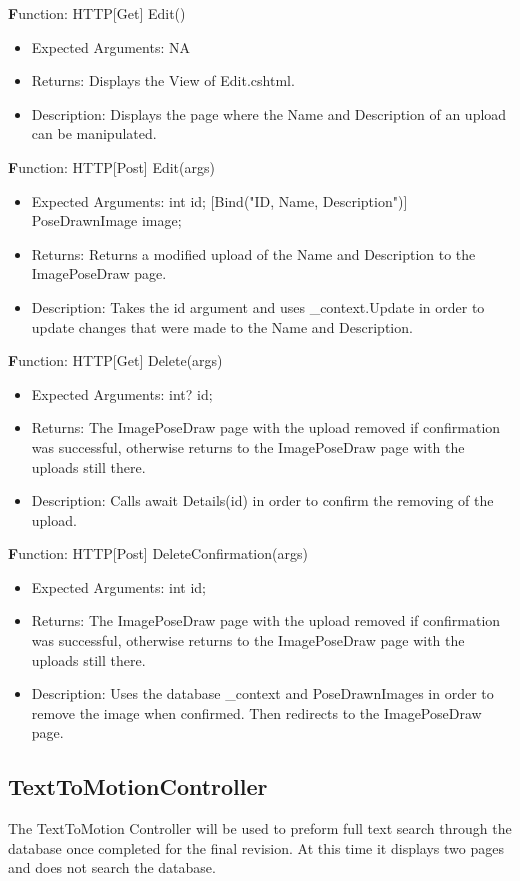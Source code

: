 \documentclass{scrreprt}
\begin{document}
  \textbf Function: HTTP[Get] Edit()
  \begin{itemize}
    \item Expected Arguments:
    NA
    \item Returns:
    Displays the View of Edit.cshtml.
    \item Description:
    Displays the page where the Name and Description of an upload can be manipulated.
  \end{itemize}

  \textbf Function: HTTP[Post] Edit(args)
  \begin{itemize}
    \item Expected Arguments:
    int id;
    [Bind("ID, Name, Description")] PoseDrawnImage image;
    \item Returns:
    Returns a modified upload of the Name and Description to the ImagePoseDraw page.
    \item Description:
    Takes the id argument and uses \_context.Update in order to update changes that were made to the Name and Description.
  \end{itemize}

  \textbf Function: HTTP[Get] Delete(args)
  \begin{itemize}
    \item Expected Arguments:
    int? id;
    \item Returns:
    The ImagePoseDraw page with the upload removed if confirmation was successful, otherwise returns to the ImagePoseDraw page with the uploads still there.
    \item Description:
    Calls await Details(id) in order to confirm the removing of the upload.
  \end{itemize}

  \textbf Function: HTTP[Post] DeleteConfirmation(args)
  \begin{itemize}
    \item Expected Arguments:
    int id;
    \item Returns:
    The ImagePoseDraw page with the upload removed if confirmation was successful, otherwise returns to the ImagePoseDraw page with the uploads still there.
    \item Description:
    Uses the database \_context and PoseDrawnImages in order to remove the image when confirmed. Then redirects to the ImagePoseDraw page.
  \end{itemize}

\subsection{TextToMotionController}
The TextToMotion Controller will be used to preform full text search through the database once completed for the final revision. At this time it displays two pages and does not search the database.
\end{document}
